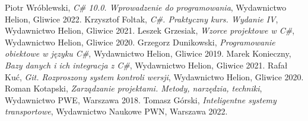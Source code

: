 \documentclass[polish,12pt,twoside,a4paper]{report}
\begin{document}




\newpage

\newpage

\newpage

\newpage

\newpage

\newpage

\newpage

\begin{thebibliography}{9}

 Piotr Wróblewski, {\it C# 10.0. Wprowadzenie do programowania}, Wydawnictwo Helion, Gliwice 2022.  
 Krzysztof Foltak, {\it C#. Praktyczny kurs. Wydanie IV}, Wydawnictwo Helion, Gliwice 2021.  
 Leszek Grzesiak, {\it Wzorce projektowe w C#}, Wydawnictwo Helion, Gliwice 2020.  
 Grzegorz Dunikowski, {\it Programowanie obiektowe w języku C#}, Wydawnictwo Helion, Gliwice 2019.  
 Marek Konieczny, {\it Bazy danych i ich integracja z C#}, Wydawnictwo Helion, Gliwice 2021.  
 Rafał Kuć, {\it Git. Rozproszony system kontroli wersji}, Wydawnictwo Helion, Gliwice 2020.  
 Roman Kotapski, {\it Zarządzanie projektami. Metody, narzędzia, techniki}, Wydawnictwo PWE, Warszawa 2018.  
 Tomasz Górski, {\it Inteligentne systemy transportowe}, Wydawnictwo Naukowe PWN, Warszawa 2022.  

\end{thebibliography}
\newpage



\end{document}
